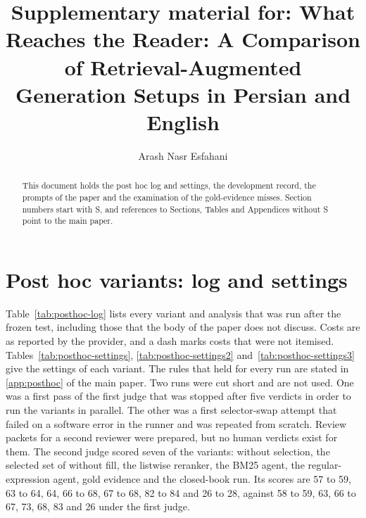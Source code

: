 \documentclass[preprint,12pt]{elsarticle}
\begin{document}
\begin{frontmatter}
\title{Supplementary material for: What Reaches the Reader: A Comparison of Retrieval-Augmented Generation Setups in Persian and English}
\author[ut]{Arash Nasr Esfahani}
\begin{abstract}
This document holds the post hoc log and settings, the development record, the prompts of the paper and the examination of the gold-evidence misses. Section numbers start with S, and references to Sections, Tables and Appendices without S point to the main paper.
\end{abstract}
\end{frontmatter}

\section{Post hoc variants: log and settings}
\label{supp:log}
Table~\ref{tab:posthoc-log} lists every variant and analysis that was run after the frozen test, including those that the body of the paper does not discuss.
Costs are as reported by the provider, and a dash marks costs that were not itemised.
Tables~\ref{tab:posthoc-settings}, \ref{tab:posthoc-settings2} and~\ref{tab:posthoc-settings3} give the settings of each variant.
The rules that held for every run are stated in \ref{app:posthoc} of the main paper.
Two runs were cut short and are not used.
One was a first pass of the first judge that was stopped after five verdicts in order to run the variants in parallel.
The other was a first selector-swap attempt that failed on a software error in the runner and was repeated from scratch.
Review packets for a second reviewer were prepared, but no human verdicts exist for them.
The second judge scored seven of the variants: \lexb{} without selection, the selected set of \setr{} without fill, the listwise reranker, the BM25 agent, the regular-expression agent, gold evidence and the closed-book run.
Its scores are 57 to 59, 63 to 64, 64, 66 to 68, 67 to 68, 82 to 84 and 26 to 28, against 58 to 59, 63, 66 to 67, 73, 68, 83 and 26 under the first judge.


\end{document}
